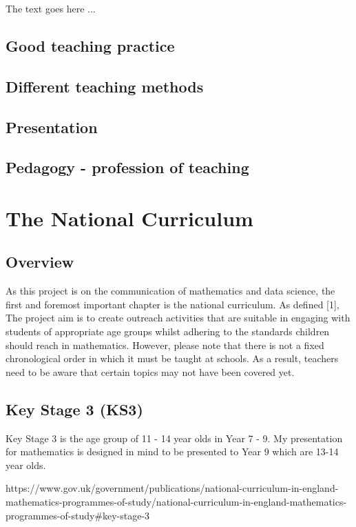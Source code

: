 \documentclass[12pt, a4paper,oneside]{book}
\numberwithin{equation}{section}
\begin{document}
The text goes here ...

\section{Good teaching practice}\label{sec:x.x}

\section{Different teaching methods}\label{sec:x.x}

\section{Presentation}\label{sec:x.x}

\section{Pedagogy - profession of teaching}\label{sec:x.x}

\chapter{The National Curriculum}\label{ch:x}

\section{Overview}\label{sec:x.x}

As this project is on the communication of mathematics and data science, the first and foremost important chapter is the national curriculum. As defined [1], The project aim is to create outreach activities that are suitable in engaging with students of appropriate age groups whilst adhering to the standards children should reach in mathematics. However, please note that there is not a fixed chronological order in which it must be taught at schools. As a result, teachers need to be aware that certain topics may not have been covered yet.

\section{Key Stage 3 (KS3)}\label{sec:x.x}

Key Stage 3 is the age group of 11 - 14 year olds in Year 7 - 9. My presentation for mathematics is designed in mind to be presented to Year 9 which are 13-14 year olds.

https://www.gov.uk/government/publications/national-curriculum-in-england-mathematics-programmes-of-study/national-curriculum-in-england-mathematics-programmes-of-study#key-stage-3
\end{document}

